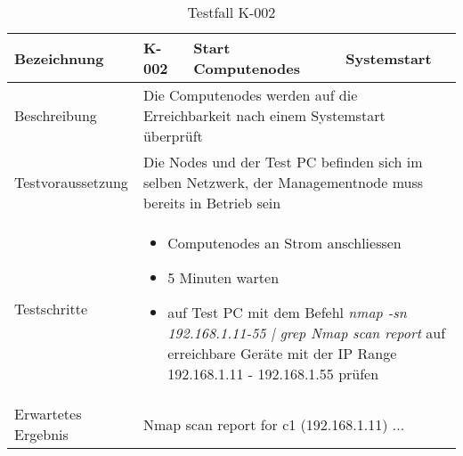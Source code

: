 \begin{table}[H]
\centering
\begin{tabular}{|p{4cm}|p{4cm}|p{4cm}|p{4cm}|}
\hline
Bezeichnung & \textbf{K-002} & Start Computenodes & Systemstart \\ \hline
Beschreibung & \multicolumn{3}{p{12cm}|}{Die Computenodes werden auf die Erreichbarkeit nach einem Systemstart überprüft} \\ \hline
Testvoraussetzung & \multicolumn{3}{p{12cm}|}{Die Nodes und der Test PC befinden sich im selben Netzwerk, der Managementnode muss bereits in Betrieb sein} \\\hline
Testschritte & \multicolumn{3}{p{12cm}|}{\begin{itemize}
\item Computenodes an Strom anschliessen
\item 5 Minuten warten
\item auf Test PC mit dem Befehl  \textit{nmap -sn 192.168.1.11-55 | grep Nmap scan report} auf erreichbare Geräte mit der IP Range 192.168.1.11 - 192.168.1.55 prüfen
\end{itemize}} \\ \hline
Erwartetes Ergebnis & \multicolumn{3}{p{12cm}|}{
Nmap scan report for c1 (192.168.1.11) \newline
...}\\ \hline
\end{tabular}
\caption{Testfall K-002}
\label{Testfall K-002}
\end{table}


